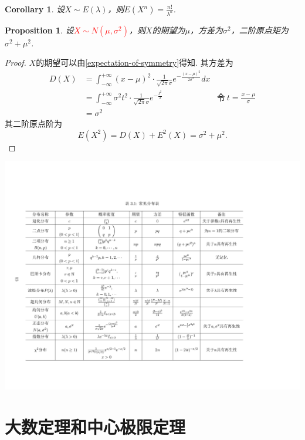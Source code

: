 \documentclass{article}
\newtheorem{corollary}[theorem]{Corollary}
\newtheorem{proposition}[theorem]{Proposition}
\newcommand{\redt}[1]{\textcolor{red}{#1}}
\begin{document}
\begin{corollary}
\rm 设$X \sim E(\lambda)$，则$E(X^n) = \frac{n!}{\lambda^n}$.
\end{corollary}

\begin{proposition}
\rm 设\redt{$X \sim N(\mu,\sigma^2)$}，则$X$的期望为$\mu$，方差为$\sigma^2$，二阶原点矩为$\sigma^2+\mu^2$.
\end{proposition}

\begin{proof}
$X$的期望可以由\ref{expectation-of-symmetry}得知. 其方差为
$$
\begin{array}{llr}
D(X) &= \int_{-\infty}^{+\infty} (x-\mu)^2 \cdot \frac{1}{\sqrt{2\pi}\sigma} e^{-\frac{(x-\mu)^2}{2\sigma^2}}dx  \\
&= \int_{-\infty}^{+\infty} \sigma^2 t^2 \cdot \frac{1}{\sqrt{2\pi}\sigma} e^{-\frac{t^2}{2}} & \text{令}~t=\frac{x-\mu}{\sigma} \\
&=\sigma^2
\end{array}
$$
其二阶原点阶为
$$
E(X^2) = D(X)+E^2(X) =  \sigma^2 + \mu^2.
$$
\end{proof}



\includegraphics[scale=0.2]{images/regular_distribution_characterize.jpg}


\newpage
\section{大数定理和中心极限定理}
\end{document}
